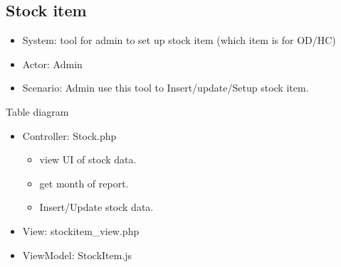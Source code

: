 \documentclass[letterpaper,10pt,english,openany,oneside]{sphinxmanual}
\begin{document}
\subsection{Stock item}
\label{\detokenize{module/module:stock-item}}\begin{itemize}
\item {} 
\sphinxAtStartPar
System: tool for admin to set up stock item (which item is for OD/HC)

\item {} 
\sphinxAtStartPar
Actor: Admin

\item {} 
\sphinxAtStartPar
Scenario: Admin use this tool to Insert/update/Setup stock item.

\end{itemize}

\sphinxAtStartPar
Table diagram

\begin{sphinxVerbatim}[commandchars=\\\{\}]
              
  
              
\end{sphinxVerbatim}
\begin{itemize}
\item {} 
\sphinxAtStartPar
Controller: Stock.php
\begin{itemize}
\item {} 
\sphinxAtStartPar
{} view UI of stock data.

\item {} 
\sphinxAtStartPar
{} get month of report.

\item {} 
\sphinxAtStartPar
{} Insert/Update stock data.

\end{itemize}

\begin{sphinxVerbatim}[commandchars=\\\{\}]
   
 
\end{sphinxVerbatim}

\item {} 
\sphinxAtStartPar
View: stockitem\_view.php

\item {} 
\sphinxAtStartPar
ViewModel: StockItem.js

\end{itemize}
\end{document}
